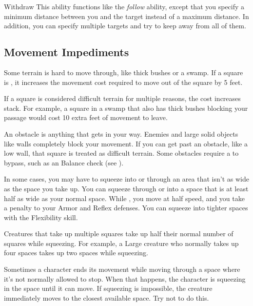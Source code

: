         \begin{activeability}{Withdraw}
            \rankline
            This ability functions like the \textit{follow} ability, except that you specify a minimum distance between you and the target instead of a maximum distance.
            In addition, you can specify multiple targets and try to keep away from all of them.
        \end{activeability}

    \subsection{Movement Impediments}

        \label{Difficult Terrain}
        Some terrain is hard to move through, like thick bushes or a swamp.
        If a square is , it increases the movement cost required to move out of the square by 5 feet.

        If a square is considered difficult terrain for multiple reasons, the cost increases stack.
        For example, a square in a swamp that also has thick bushes blocking your passage would cost 10 extra feet of movement to leave.

        An obstacle is anything that gets in your way. Enemies and large solid objects like walls completely block your movement. If you can get past an obstacle, like a low wall, that square is treated as difficult terrain. Some obstacles require a  to bypass, such as an Balance check (see ).

        \label{Squeezing}
        In some cases, you may have to squeeze into or through an area that isn't as wide as the space you take up.
        You can squeeze through or into a space that is at least half as wide as your normal space.
        While \squeezing, you move at half speed, and you take a  penalty to your Armor and Reflex defenses.
        You can squeeze into tighter spaces with the Flexibility skill.

        Creatures that take up multiple squares take up half their normal number of squares while squeezing. For example, a Large creature who normally takes up four spaces takes up two spaces while squeezing.

         Sometimes a character ends its movement while moving through a space where it's not normally allowed to stop. When that happens, the character is squeezing in the space until it can move. If squeezing is impossible, the creature immediately moves to the closest available space. Try not to do this.

